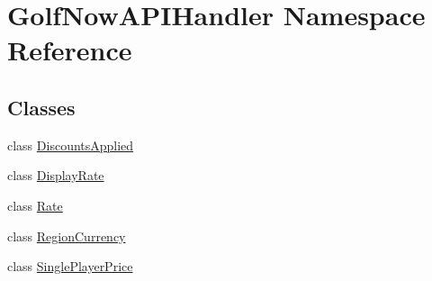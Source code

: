 \hypertarget{namespace_golf_now_a_p_i_handler}{}\section{Golf\+Now\+A\+P\+I\+Handler Namespace Reference}
\label{namespace_golf_now_a_p_i_handler}
\subsection*{Classes}
\begin{DoxyCompactItemize}
\item 
class \mbox{\hyperlink{class_golf_now_a_p_i_handler_1_1_discounts_applied}{Discounts\+Applied}}
\item 
class \mbox{\hyperlink{class_golf_now_a_p_i_handler_1_1_display_rate}{Display\+Rate}}
\item 
class \mbox{\hyperlink{class_golf_now_a_p_i_handler_1_1_rate}{Rate}}
\item 
class \mbox{\hyperlink{class_golf_now_a_p_i_handler_1_1_region_currency}{Region\+Currency}}
\item 
class \mbox{\hyperlink{class_golf_now_a_p_i_handler_1_1_single_player_price}{Single\+Player\+Price}}
\end{DoxyCompactItemize}
